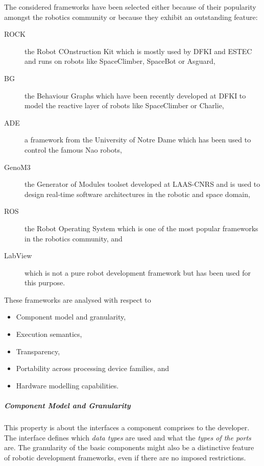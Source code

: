 \documentclass[a4paper,twocolumn]{esapub2005} %
\begin{document}
The considered frameworks have been selected either because of their popularity amongst the robotics community or because they exhibit an outstanding feature:
\begin{description}
    \item[ROCK] the Robot COnstruction Kit which is mostly used by DFKI and ESTEC and runs on robots like SpaceClimber, SpaceBot or Asguard\cite{ROCK},
    \item[BG] the Behaviour Graphs which have been recently developed at DFKI to model the reactive layer of robots like SpaceClimber or Charlie\cite{2012_Langosz},
    \item[ADE] a framework from the University of Notre Dame which has been used to control the famous Nao robots\cite{Scheutz},
    \item[GenoM3] the Generator of Modules toolset developed at LAAS-CNRS and is used to design real-time software architectures in the robotic and space domain\cite{2015_Genom3},
    \item[ROS] the Robot Operating System which is one of the most popular frameworks in the robotics community\cite{ROS}, and
    \item[LabView] which is not a pure robot development framework but has been used for this purpose\cite{2010_Muecke}.
\end{description}
These frameworks are analysed with respect to
\begin{itemize}
    \item Component model and granularity,
    \item Execution semantics,
    \item Transparency,
    \item Portability across processing device families, and
    \item Hardware modelling capabilities.
\end{itemize}

\subparagraph{Component Model and Granularity}
This property is about the interfaces a component comprises to the developer.
The interface defines which \emph{data types} are used and what the \emph{types of the ports} are.
The granularity of the basic components might also be a distinctive feature of robotic development frameworks, even if there are no imposed restrictions.
\end{document}
